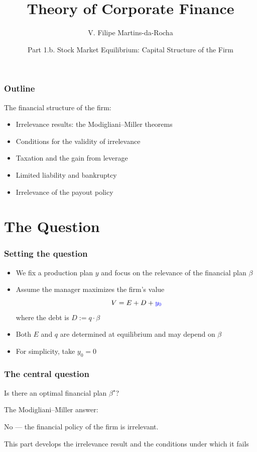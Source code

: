 \documentclass[blue]{beamer}
\title[Corporate Finance]{Theory of Corporate Finance}
\author[Victor Filipe]{V. Filipe Martins-da-Rocha}
\institute[FGV EESP]{Escola de Economia de S\~ao Paulo}
\date[April-June, 2026]{Part 1.b. Stock Market Equilibrium: Capital Structure of the Firm}
\theoremstyle{definition}
\theoremstyle{example}
\begin{document}
\frame{\titlepage}

\begin{frame}\frametitle{Outline}
The financial structure of the firm:
\begin{itemize}
\item Irrelevance results: the Modigliani--Miller theorems
\item Conditions for the validity of irrelevance
\item Taxation and the gain from leverage
\item Limited liability and bankruptcy
\item Irrelevance of the payout policy
\end{itemize}
\end{frame}

\section{The Question}

\begin{frame}\frametitle{Setting the question}
\begin{itemize}
\item We fix a production plan $y$ and focus on the relevance of the financial plan $\beta$
\item Assume the manager maximizes the firm's value
\begin{equation*}
V = E + D + \textcolor{blue}{y_0}
\end{equation*}
where the debt is $D := q \cdot \beta$
\item Both $E$ and $q$ are determined at equilibrium and may depend on $\beta$
\item For simplicity, take $y_0 = 0$
\end{itemize}
\end{frame}

\begin{frame}\frametitle{The central question}
\begin{center}
\Large \alert{Is there an optimal financial plan $\beta^\star$?}
\end{center}
\bigskip

The Modigliani--Miller answer:
\begin{center}
\Large \alert{No --- the financial policy of the firm is irrelevant.}
\end{center}
\bigskip

This part develops the irrelevance result and the conditions under which it fails
\end{frame}
\end{document}
